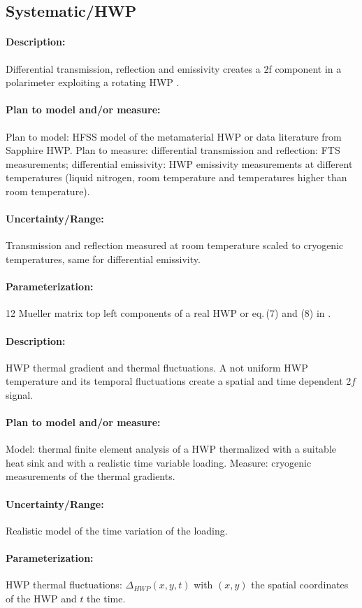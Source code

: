 \subsection{Systematic/HWP}

\paragraph{Description:}
Differential transmission, reflection and emissivity creates a $2$f component in a polarimeter exploiting a rotating HWP
\cite{Salatino10}.

\paragraph{Plan to model and/or measure:}
Plan to model: HFSS model of the metamaterial HWP or data literature from Sapphire HWP.
Plan to measure:
differential transmission and reflection: FTS measurements;
differential emissivity: HWP emissivity measurements at different temperatures
(liquid nitrogen, room temperature and temperatures higher than room temperature).

\paragraph{Uncertainty/Range:}
Transmission and reflection measured at room temperature scaled to cryogenic temperatures, same for differential emissivity.

\paragraph{Parameterization:}
12 Mueller matrix top left components of a real HWP or eq.$\,$(7) and (8) in \cite{Salatino16}.



\paragraph{Description:}
HWP thermal gradient and thermal fluctuations. A not uniform HWP temperature and its temporal fluctuations create a spatial and time dependent 2$f$ signal.

\paragraph{Plan to model and/or measure:}
Model: thermal finite element analysis of a HWP thermalized with a suitable heat sink and with a realistic time variable loading.
Measure: cryogenic measurements of the thermal gradients.


\paragraph{Uncertainty/Range:}
Realistic model of the time variation of the loading.


\paragraph{Parameterization:}
HWP thermal fluctuations: $\Delta_{HWP}(x,y,t)$ with $(x,y)$ the spatial coordinates of the HWP and $t$ the time.
